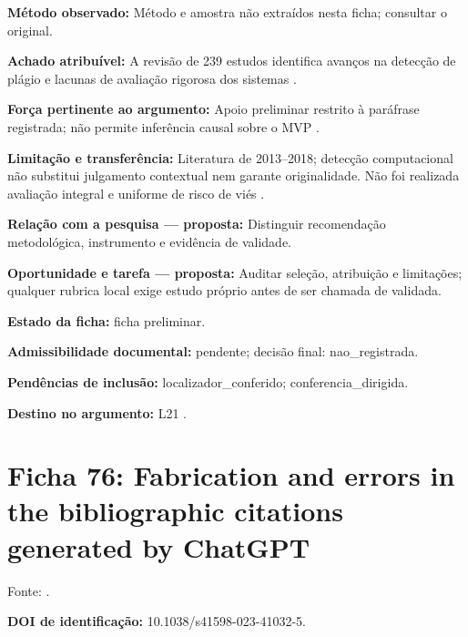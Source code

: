 \noindent\textbf{Método observado:} Método e amostra não extraídos nesta ficha; consultar o original.\par\medskip

\noindent\textbf{Achado atribuível:} A revisão de 239 estudos identifica avanços na detecção de plágio e lacunas de avaliação rigorosa dos sistemas \citep{SU05}.\par\medskip

\noindent\textbf{Força pertinente ao argumento:} Apoio preliminar restrito à paráfrase registrada; não permite inferência causal sobre o MVP \citep{SU05}.\par\medskip

\noindent\textbf{Limitação e transferência:} Literatura de 2013–2018; detecção computacional não substitui julgamento contextual nem garante originalidade. Não foi realizada avaliação integral e uniforme de risco de viés \citep{SU05}.\par\medskip

\noindent\textbf{Relação com a pesquisa — proposta:} Distinguir recomendação metodológica, instrumento e evidência de validade.\par\medskip

\noindent\textbf{Oportunidade e tarefa — proposta:} Auditar seleção, atribuição e limitações; qualquer rubrica local exige estudo próprio antes de ser chamada de validada.\par\medskip

\noindent\textbf{Estado da ficha:} ficha preliminar.\par\medskip

\noindent\textbf{Admissibilidade documental:} pendente; decisão final: nao\_registrada.\par\medskip

\noindent\textbf{Pendências de inclusão:} localizador\_conferido; conferencia\_dirigida.\par\medskip

\noindent\textbf{Destino no argumento:} L21 .

\clearpage\section*{Ficha 76: Fabrication and errors in the bibliographic citations generated by ChatGPT}

Fonte: \citet{SU06}.

\noindent\textbf{DOI de identificação:} 10.1038/s41598-023-41032-5.\par\medskip

